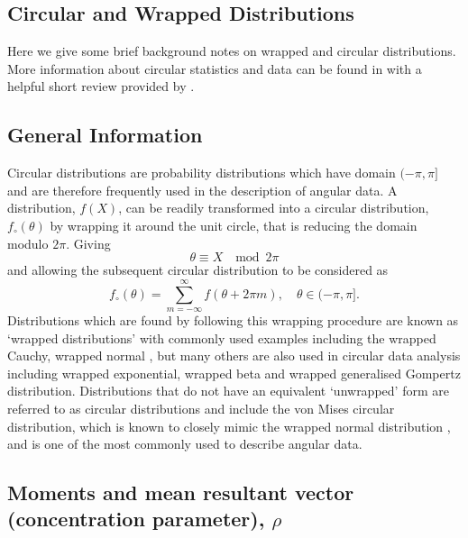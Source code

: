 \documentclass[english]{article}
\begin{document}
\begin{appendices}

\section{Circular and Wrapped Distributions}\label{secA1}
Here we give some brief background notes on wrapped and circular distributions.  More information about circular statistics and data can be found in \citet{jammalamadaka2001topics,fisher1995statistical,pewsey2013circular,mardia2009directional} with a helpful short review provided by \citet{lee2010circular}.

\subsection{General Information}
Circular distributions are probability distributions which have domain $(-\pi,\pi]$ and are therefore frequently used in the description of angular data.  A distribution, $f(X)$, can be readily transformed into a circular distribution, $f_\circ(\theta)$ by wrapping it around the unit circle, that is reducing the domain modulo $2\pi$.  Giving
\begin{equation}
    \theta\equiv X\;\mod{2\pi}
\end{equation}
and allowing the subsequent circular distribution to be considered as
\begin{equation}
    f_\circ(\theta)=\sum_{m=-\infty}^{\infty}f(\theta+2\pi m),\quad \theta\in(-\pi,\pi].
    \label{eq: wrap def}
\end{equation}
Distributions which are found by following this wrapping procedure are known as `wrapped distributions' with commonly used examples including the wrapped Cauchy, wrapped normal \citep{bailey2021emergence}, but many others are also used in circular data analysis including wrapped exponential, wrapped beta and wrapped generalised Gompertz distribution.  Distributions that do not have an equivalent `unwrapped' form are referred to as circular distributions and include the von Mises circular distribution, which is known to closely mimic the wrapped normal distribution \citep{stephens1963random,collett1981discriminating}, and is one of the most commonly used to describe angular data.
\subsection{Moments and mean resultant vector (concentration parameter), $\rho$}


\end{appendices}
\end{document}
